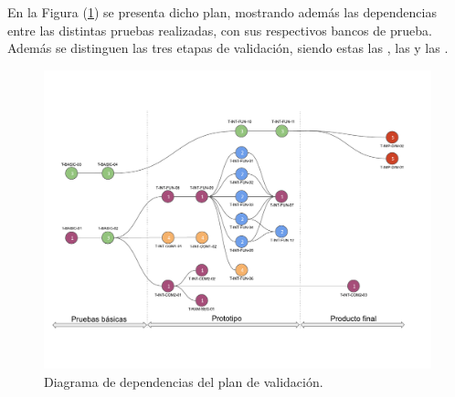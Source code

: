 En la Figura (\ref{fig:diagrama_plan_validacion}) se presenta dicho plan, mostrando además las dependencias entre las distintas pruebas realizadas, con sus respectivos bancos de prueba. Además se distinguen las tres etapas de validación, siendo estas las , las  y las .
\begin{figure}[H]
	\centering
	\includegraphics[width=0.9\linewidth,page=1]{ImagenesPlan de validacion/Diagrama de Dependencias de Validacion}
	\caption{Diagrama de dependencias del plan de validación.}
	\label{fig:diagrama_plan_validacion}
\end{figure}

%